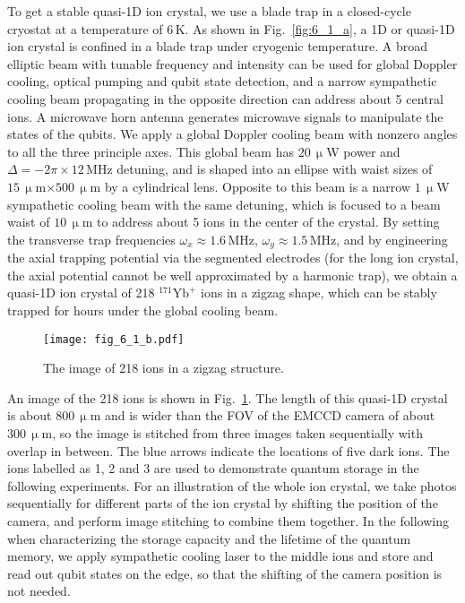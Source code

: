 To get a stable quasi-1D ion crystal, we use a blade trap in a closed-cycle cryostat at a temperature of $6\,$K. As shown in Fig.~\ref{fig:6_1_a}, a 1D or quasi-1D ion crystal is confined in a blade trap under cryogenic temperature. A broad elliptic beam with tunable frequency and intensity can be used for global Doppler cooling, optical pumping and qubit state detection, and a narrow sympathetic cooling beam propagating in the opposite direction can address about 5 central ions. A microwave horn antenna generates microwave signals to manipulate the states of the qubits. We apply a global Doppler cooling beam with nonzero angles to all the three principle axes. This global beam has $20\,\upmu$W power and $\Delta=-2\pi\times 12\,$MHz detuning, and is shaped into an ellipse with waist sizes of $15\,\upmu$m$\times 500\,\upmu$m by a cylindrical lens. Opposite to this beam is a narrow $1\,\upmu$W sympathetic cooling beam with the same detuning, which is focused to a beam waist of $10\,\upmu$m to address about 5 ions in the center of the crystal. By setting the transverse trap frequencies $\omega_x\approx 1.6\,$MHz, $\omega_y\approx 1.5\,$MHz, and by engineering the axial trapping potential via the segmented electrodes (for the long ion crystal, the axial potential cannot be well approximated by a harmonic trap), we obtain a quasi-1D ion crystal of 218 $^{171}\mathrm{Yb}^+$ ions in a zigzag shape, which can be stably trapped for hours under the global cooling beam.

\begin{figure}
    \centering
    \texttt{[image: fig\_6\_1\_b.pdf]}
    \caption{The image of 218 ions in a zigzag structure.}
    \label{fig:6_1_b}
\end{figure}

An image of the 218 ions is shown in Fig.~\ref{fig:6_1_b}. The length of this quasi-1D crystal is about $800\,\upmu$m and is wider than the FOV of the EMCCD camera of about $300\,\upmu$m, so the image is stitched from three images taken sequentially with overlap in between. The blue arrows indicate the locations of five dark ions. The ions labelled as 1, 2 and 3 are used to demonstrate quantum storage in the following experiments. For an illustration of the whole ion crystal, we take photos sequentially for different parts of the ion crystal by shifting the position of the camera, and perform image stitching to combine them together. In the following when characterizing the storage capacity and the lifetime of the quantum memory, we apply sympathetic cooling laser to the middle ions and store and read out qubit states on the edge, so that the shifting of the camera position is not needed.



